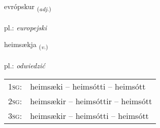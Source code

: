 \documentclass[frontgrid, backgrid]{flacards}\usepackage[]{graphicx}\usepackage[]{xcolor}
\begin{document}
\renewcommand{\flhead}{\vskip5pt \fboxsep=0pt {\small\bfseries\footnotesize Lýsingarorð | Adjective}}
\renewcommand{\fcfoot}{\vskip5pt \fboxsep=0pt \hspace{2pt}{\small\bfseries\footnotesize 2K}}

\renewcommand{\blhead}{\vskip5pt {\small\bfseries\footnotesize Lýsingarorð | Adjective }}
\renewcommand{\bcfoot}{\vskip5pt \hspace{2pt}{\small\bfseries\footnotesize 2K}}


{evrópskur \small{\textsubscript{(\textit{adj.})}} \\[1ex] %
\textphonetic{[ɛvrouskʏr]} \\
pl.: \emph{europejski} \\  [2ex]
\renewcommand*{\arraystretch}{0.8}
}

\renewcommand{\flhead}{\vskip5pt \fboxsep=0pt {\small\bfseries\footnotesize Sagnorð | Verb}}
\renewcommand{\fcfoot}{\vskip5pt \fboxsep=0pt \hspace{2pt}{\small\bfseries\footnotesize 2K}}

\renewcommand{\blhead}{\vskip5pt {\small\bfseries\footnotesize Sagnorð | Verb }}
\renewcommand{\bcfoot}{\vskip5pt \hspace{2pt}{\small\bfseries\footnotesize 2K}}


{heimsækja \small{\textsubscript{(\textit{v.})}} \\[1ex] %
\textphonetic{[heimsaica]} \\
pl.: \emph{odwiedzić} \\  [2ex]
\renewcommand*{\arraystretch}{0.8}
\begin{tabular}{p{1cm}l}
\textsc{1sg}: & heimsæki -- heimsótti -- heimsótt \\ 
\textsc{2sg}: & heimsækir -- heimsóttir -- heimsótt \\ 
\textsc{3sg}: & heimsækir -- heimsótti -- heimsótt \\ 
\end{tabular}
}
\end{document}
